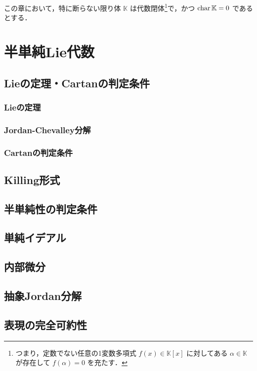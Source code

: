 \documentclass[rep_main]{subfiles}
\begin{document}
\setcounter{chapter}{1}

この章において，特に断らない限り体 $\mathbb{K}$ は代数閉体\footnote{つまり，定数でない任意の1変数多項式 $f(x) \in \mathbb{K}[x]$ に対してある $\alpha \in \mathbb{K}$ が存在して $f(\alpha) = 0$ を充たす．}で，かつ $\operatorname{char} \mathbb{K} = 0$ であるとする．

\chapter{半単純Lie代数}

\section{Lieの定理・Cartanの判定条件}

\subsection{Lieの定理}

\subsection{Jordan-Chevalley分解}
\subsection{Cartanの判定条件}

\section{Killing形式}

\section{半単純性の判定条件}
\section{単純イデアル}
\section{内部微分}
\section{抽象Jordan分解}

\section{表現の完全可約性}
\end{document}
